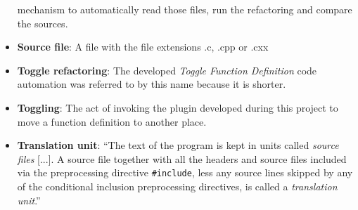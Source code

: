 \begin{itemize}
mechanism to automatically read those files, run the refactoring and compare the 
sources.
\item \textbf{Source file}: A file with the file extensions .c, .cpp or .cxx
\item \textbf{Toggle refactoring}: The developed \textit{Toggle Function 
Definition} code automation was referred to by this name because it is shorter.
\item \textbf{Toggling}: The act of invoking the plugin developed during this 
project to move a function definition to another place.
\item \textbf{Translation unit}: ``The text of the program is kept in units 
called \textit{source files} [...]. A source file together with all the headers and 
source files included via the preprocessing directive \texttt{\#include}, less 
any source lines skipped by any of the conditional inclusion preprocessing 
directives, is called a \textit{translation unit}.''\cite{IsoCpp}
\end{itemize}

